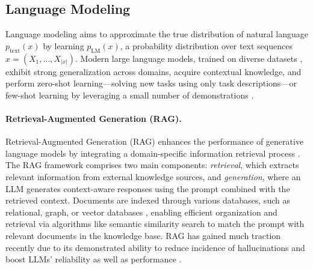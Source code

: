 \subsection{Language Modeling}
Language modeling aims to approximate the true distribution of natural language \( p_{\text{text}}(x) \) by learning \( p_{\text{LM}}(x) \), a probability distribution over text sequences \( x = (X_1, \ldots, X_{|x|}) \). Modern large language models, trained on diverse datasets \citep{gao2020pile}, exhibit strong generalization across domains, acquire contextual knowledge, and perform zero-shot learning—solving new tasks using only task descriptions—or few-shot learning by leveraging a small number of demonstrations \citep{brown2020gpt3}.
\paragraph{Retrieval-Augmented Generation (RAG).} Retrieval-Augmented Generation (RAG) enhances the performance of generative language models by  integrating a domain-specific information retrieval process  \citep{lewis2020retrieval}. The RAG framework comprises two main components: \textit{retrieval}, which extracts relevant information from external knowledge sources, and \textit{generation}, where an LLM generates context-aware responses using the prompt combined with the retrieved context. Documents are indexed through various databases, such as relational, graph, or vector databases \citep{khattab2020colbert, douze2024faiss, peng2024graphretrievalaugmentedgenerationsurvey}, enabling efficient organization and retrieval via algorithms like semantic similarity search to match the prompt with relevant documents in the knowledge base. RAG has gained much traction recently due to its demonstrated ability to reduce incidence of hallucinations and boost LLMs' reliability as well as performance \citep{huang2023hallucination, zhang2023merging}. 
 
